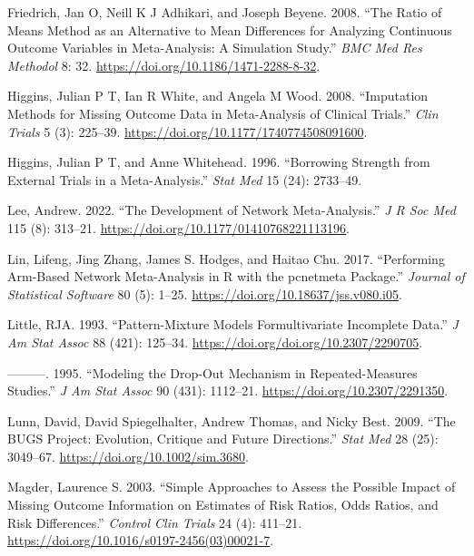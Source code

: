 \begin{CSLReferences}{1}{0}
\leavevmode{}%
Friedrich, Jan O, Neill K J Adhikari, and Joseph Beyene. 2008. {``The Ratio of Means Method as an Alternative to Mean Differences for Analyzing Continuous Outcome Variables in Meta-Analysis: A Simulation Study.''} \emph{BMC Med Res Methodol} 8: 32. \url{https://doi.org/10.1186/1471-2288-8-32}.

\leavevmode{}%
Higgins, Julian P T, Ian R White, and Angela M Wood. 2008. {``Imputation Methods for Missing Outcome Data in Meta-Analysis of Clinical Trials.''} \emph{Clin Trials} 5 (3): 225--39. \url{https://doi.org/10.1177/1740774508091600}.

\leavevmode{}%
Higgins, Julian P T, and Anne Whitehead. 1996. {``Borrowing Strength from External Trials in a Meta-Analysis.''} \emph{Stat Med} 15 (24): 2733--49.

\leavevmode{}%
Lee, Andrew. 2022. {``The Development of Network Meta-Analysis.''} \emph{J R Soc Med} 115 (8): 313--21. \url{https://doi.org/10.1177/01410768221113196}.

\leavevmode{}%
Lin, Lifeng, Jing Zhang, James S. Hodges, and Haitao Chu. 2017. {``Performing Arm-Based Network Meta-Analysis in {R} with the {pcnetmeta} Package.''} \emph{Journal of Statistical Software} 80 (5): 1--25. \url{https://doi.org/10.18637/jss.v080.i05}.

\leavevmode{}%
Little, RJA. 1993. {``Pattern-Mixture Models Formultivariate Incomplete Data.''} \emph{J Am Stat Assoc} 88 (421): 125--34. \url{https://doi.org/doi.org/10.2307/2290705}.

\leavevmode{}%
---------. 1995. {``Modeling the Drop-Out Mechanism in Repeated-Measures Studies.''} \emph{J Am Stat Assoc} 90 (431): 1112--21. \url{https://doi.org/10.2307/2291350}.

\leavevmode{}%
Lunn, David, David Spiegelhalter, Andrew Thomas, and Nicky Best. 2009. {``The BUGS Project: Evolution, Critique and Future Directions.''} \emph{Stat Med} 28 (25): 3049--67. \url{https://doi.org/10.1002/sim.3680}.

\leavevmode{}%
Magder, Laurence S. 2003. {``Simple Approaches to Assess the Possible Impact of Missing Outcome Information on Estimates of Risk Ratios, Odds Ratios, and Risk Differences.''} \emph{Control Clin Trials} 24 (4): 411--21. \url{https://doi.org/10.1016/s0197-2456(03)00021-7}.


\end{CSLReferences}
